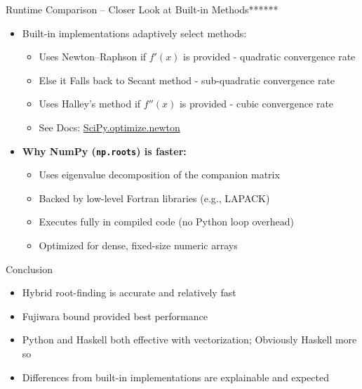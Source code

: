 \documentclass{beamer}
\begin{document}
\begin{frame}{Runtime Comparison – Closer Look at Built-in Methods******}
\begin{itemize}
    \item Built-in implementations adaptively select methods:
    \begin{itemize}
        \item Uses Newton–Raphson if $f'(x)$ is provided - quadratic convergence rate
        \item Else it Falls back to Secant method - sub-quadratic convergence rate
        \item Uses Halley’s method if $f''(x)$ is provided - cubic convergence rate
        \item See Docs: \href{https://docs.scipy.org/doc/scipy-0.14.0/reference/generated/scipy.optimize.newton.html}{SciPy.optimize.newton}
    \end{itemize}


    \item \textbf{Why NumPy (\texttt{np.roots}) is faster:}
    \begin{itemize}
        \item Uses eigenvalue decomposition of the companion matrix
        \item Backed by low-level Fortran libraries (e.g., LAPACK)
        \item Executes fully in compiled code (no Python loop overhead)
        \item Optimized for dense, fixed-size numeric arrays
    \end{itemize}

\end{itemize}
\end{frame}

\begin{frame}{Conclusion}
\begin{itemize}
    \item Hybrid root-finding is accurate and relatively fast
    \item Fujiwara bound provided best performance
    \item Python and Haskell both effective with vectorization; Obviously Haskell more so
    \item Differences from built-in implementations are explainable and expected
\end{itemize}
\end{frame}
\end{document}
